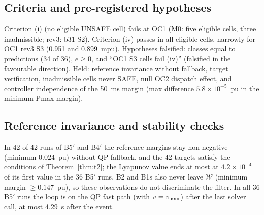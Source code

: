 \documentclass[11pt,twocolumn]{article}
\begin{document}
\subsection{Criteria and pre-registered hypotheses}
Criterion (i) (no eligible UNSAFE cell) fails at OC1 (M0: five eligible cells, three inadmissible; rev3: b31 S2). Criterion (iv) passes in all eligible cells, narrowly for OC1 rev3 S3 (0.951 and 0.899~mpu). Hypotheses falsified: classes equal to predictions (34 of 36), $e\ge0$, and ``OC1 S3 cells fail (iv)'' (falsified in the favourable direction). Held: reference invariance without fallback, target verification, inadmissible cells never SAFE, null OC2 dispatch effect, and controller independence of the 50~ms margin (max difference $5.8\times10^{-5}$~pu in the minimum-Pmax margin).

\subsection{Reference invariance and stability checks}
In 42 of 42 runs of B5$'$ and B4$'$ the reference margins stay non-negative (minimum $0.024$~pu) without QP fallback, and the 42 targets satisfy the conditions of Theorem~\ref{thm:t2}; the Lyapunov value ends at most at $4.2\times10^{-4}$ of its first value in the 36 B5$'$ runs. B2 and B1s also never leave $\mathcal W$ (minimum margin $\ge0.147$~pu), so these observations do not discriminate the filter. In all 36 B5$'$ runs the loop is on the QP fast path (with $v=v_{\rm nom}$) after the last solver call, at most 4.29~s after the event.
\end{document}
